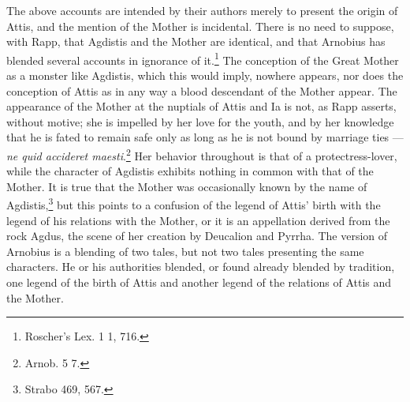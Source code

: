 \documentclass[a4paper, 11pt, oneside, polutonikogreek, english]{article}
\begin{document}
The above accounts are intended by their authors merely to present the origin of Attis, and the mention of the Mother is incidental. There is no need to suppose, with Rapp, that Agdistis and the Mother are identical, and that Arnobius has blended several accounts in ignorance of it.\footnote{Roscher's Lex. 1 1, 716.} The conception of the Great Mother as a monster like Agdistis, which this would imply, nowhere appears, nor does the conception of Attis as in any way a blood descendant of the Mother appear. The appearance of the Mother at the nuptials of Attis and Ia is not, as Rapp asserts, without motive; she is impelled by her love for the youth, and by her knowledge that he is fated to remain safe only as long as he is not bound by marriage ties --- \emph{ne quid accideret maesti}.\footnote{Arnob. 5 7.} Her behavior throughout is that of a protectress-lover, while the character of Agdistis exhibits nothing in common with that of the Mother. It is true that the Mother was occasionally known by the name of Agdistis,\footnote{Strabo 469, 567.} but this points to a confusion of the legend of Attis' birth with the legend of his relations with the Mother, or it is an appellation derived from the rock Agdus, the scene of her creation by Deucalion and Pyrrha. The version of Arnobius is a blending of two tales, but not two tales presenting the same characters. He or his authorities blended, or found already blended by tradition, one legend of the birth of Attis and another legend of the relations of Attis and the Mother.
\end{document}
